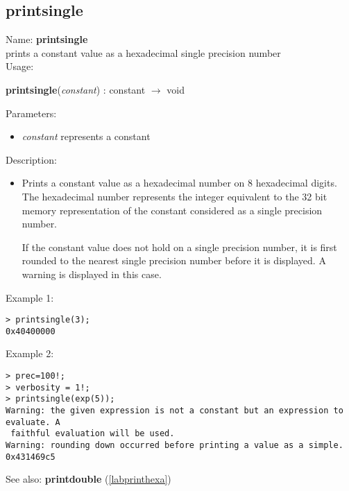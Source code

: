 \subsection{printsingle}
\label{labprintfloat}
\noindent Name: \textbf{printsingle}\\
prints a constant value as a hexadecimal single precision number\\
\noindent Usage: 
\begin{center}
\textbf{printsingle}(\emph{constant}) : \textsf{constant} $\rightarrow$ \textsf{void}\\
\end{center}
Parameters: 
\begin{itemize}
\item \emph{constant} represents a constant
\end{itemize}
\noindent Description: \begin{itemize}

\item Prints a constant value as a hexadecimal number on 8 hexadecimal
   digits. The hexadecimal number represents the integer equivalent to
   the 32 bit memory representation of the constant considered as a
   single precision number.
    
   If the constant value does not hold on a single precision number, it
   is first rounded to the nearest single precision number before it is
   displayed. A warning is displayed in this case.
\end{itemize}
\noindent Example 1: 
\begin{center}\begin{minipage}{15cm}\begin{Verbatim}[frame=single]
> printsingle(3);
0x40400000
\end{Verbatim}
\end{minipage}\end{center}
\noindent Example 2: 
\begin{center}\begin{minipage}{15cm}\begin{Verbatim}[frame=single]
> prec=100!;
> verbosity = 1!;
> printsingle(exp(5));
Warning: the given expression is not a constant but an expression to evaluate. A
 faithful evaluation will be used.
Warning: rounding down occurred before printing a value as a simple.
0x431469c5
\end{Verbatim}
\end{minipage}\end{center}
See also: \textbf{printdouble} (\ref{labprinthexa})
